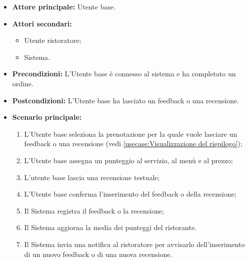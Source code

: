 \label{usecase:Inserimento di feedback e recensioni}
\begin{itemize}
	\item \textbf{Attore principale:} Utente base.

	\item \textbf{Attori secondari:}
	      \begin{itemize}
		      \item Utente ristoratore;
		      \item Sistema.
	      \end{itemize}

	\item \textbf{Precondizioni:}
	      L'Utente base è connesso al sistema e ha completato un ordine.

	\item \textbf{Postcondizioni:}
	      L'Utente base ha lasciato un feedback o una recensione.

	\item \textbf{Scenario principale:}
	      \begin{enumerate}
		      \item L'Utente base seleziona la prenotazione per la quale vuole
		            lasciare un feedback o una recensione (vedi
		            \autoref{usecase:Visualizzazione del riepilogo});

		      \item L'Utente base assegna un punteggio al servizio, al menù e al
		            prezzo;

		      \item L'utente base lascia una recensione testuale;

		      \item L'Utente base conferma l'inserimento del feedback o della
		            recensione;

		      \item Il Sistema registra il feedback o la recensione;

		      \item Il Sistema aggiorna la media dei punteggi del ristorante.

		      \item Il Sistema invia una notifica al ristoratore per avvisarlo
		            dell'inserimento di un nuovo feedback o di una nuova
		            recensione.
	      \end{enumerate}
\end{itemize}
